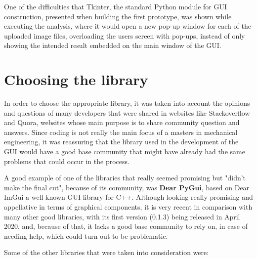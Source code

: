 
One of the difficulties that Tkinter, the standard Python module for GUI construction, presented when building the first prototype, was shown while executing the analysis, where it would open a new pop-up window for each of the uploaded image files, overloading the users screen with pop-ups, instead of only showing the intended result embedded on the main window of the GUI.


\section{Choosing the library} %
\label{sub:choosing_the_library}

\indent \indent In order to choose the appropriate library, it was taken into account the opinions and questions of many developers that were shared in websites like Stackoverflow and Quora, websites whose main purpose is to share community question and answers. Since coding is not really the main focus of a masters in mechanical engineering, it was reassuring that the library used in the development of the GUI would have a good base community that might have already had the same problems that could occur in the process.

A good example of one of the libraries that really seemed promising but "didn't make the final cut", because of its community, was \textbf{Dear PyGui}, based on Dear ImGui a well known GUI library for C++. Although looking really promising and appellative in terms of graphical components, it is very recent in comparison with many other good libraries, with its first version (0.1.3) being released in April 2020, and, because of that, it lacks a good base community to rely on, in case of needing help, which could turn out to be problematic.

Some of the other libraries that were taken into consideration were:

